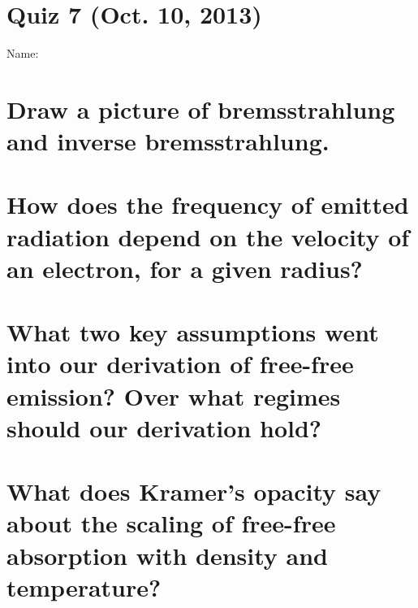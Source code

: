 \documentclass[11pt]{article}
\begin{document}
\pagestyle{empty}
\parindent=0pt

\section*{\centering Quiz 7 (Oct. 10, 2013)}

{\large
Name:\\
}

\section{Draw a picture of bremsstrahlung and inverse bremsstrahlung.}
\vspace{1.5in}
\section{How does the frequency of emitted radiation depend on the velocity of an electron, for a given radius?}
\vspace{1.5in}
\section{What two key assumptions went into our derivation of 
free-free emission? Over what regimes should our derivation hold?}
\vspace{1.5in}
\section{What does Kramer's opacity say about the scaling of free-free absorption with density and temperature?}
~
\vspace{1.5in}
\end{document}
